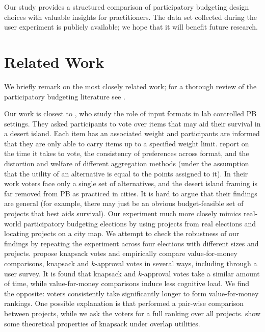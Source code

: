 \documentclass[twoside,11pt]{article}
\begin{document}
Our study provides a structured comparison of participatory budgeting design choices with valuable insights for   practitioners. 
The data set collected during the user experiment is publicly available; we  hope that it will benefit future research.  %
 
 
\section{Related Work }\label{sec:related}

We briefly remark on the most closely related work; for a thorough review of the participatory budgeting literature see .

Our work is closest to  , who study the role of input formats in lab controlled PB settings. They asked participants  to vote over items that may aid their survival in a desert island. Each item has an associated weight and participants are informed that they are only able to carry items up to a specified weight limit. 
 report on the time it takes to vote, the consistency of preferences across format, and the distortion and welfare of different aggregation methods (under the assumption that the utility of an alternative is equal to the points assigned to it).
In their work voters face only a single set of alternatives, and the desert island framing is far removed from PB as practiced in cities.  It is  hard  to argue that their findings are general  (for example, there may just be an obvious budget-feasible set of projects that best aids survival).   Our experiment much more closely mimics real-world participatory budgeting elections by using projects from real elections and  locating projects on a city map. We   attempt to check the robustness of our findings by repeating the experiment across four elections with different sizes and projects. 
 propose knapsack votes and empirically compare       value-for-money comparisons, knapsack and $k$-approval votes in several ways, including through a user survey. It is found that knapsack and $k$-approval votes take a similar amount of time, while value-for-money comparisons induce less cognitive load.  We find the opposite: voters consistently take significantly longer to  form value-for-money rankings. One possible explanation is that  performed a pair-wise comparison between projects, while we ask the voters for a full ranking over all projects.    show some theoretical properties of knapsack under overlap utilities. 
\end{document}
